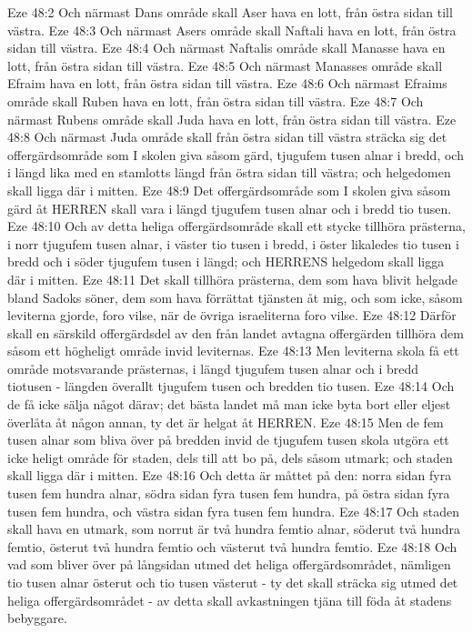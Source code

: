 Eze 48:2  Och närmast Dans område skall Aser hava en lott, från östra sidan till västra.
Eze 48:3  Och närmast Asers område skall Naftali hava en lott, från östra sidan till västra.
Eze 48:4  Och närmast Naftalis område skall Manasse hava en lott, från östra sidan till västra.
Eze 48:5  Och närmast Manasses område skall Efraim hava en lott, från östra sidan till västra.
Eze 48:6  Och närmast Efraims område skall Ruben hava en lott, från östra sidan till västra.
Eze 48:7  Och närmast Rubens område skall Juda hava en lott, från östra sidan till västra.
Eze 48:8  Och närmast Juda område skall från östra sidan till västra sträcka sig det offergärdsområde som I skolen giva såsom gärd, tjugufem tusen alnar i bredd, och i längd lika med en stamlotts längd från östra sidan till västra; och helgedomen skall ligga där i mitten.
Eze 48:9  Det offergärdsområde som I skolen giva såsom gärd åt HERREN skall vara i längd tjugufem tusen alnar och i bredd tio tusen.
Eze 48:10  Och av detta heliga offergärdsområde skall ett stycke tillhöra prästerna, i norr tjugufem tusen alnar, i väster tio tusen i bredd, i öster likaledes tio tusen i bredd och i söder tjugufem tusen i längd; och HERRENS helgedom skall ligga där i mitten.
Eze 48:11  Det skall tillhöra prästerna, dem som hava blivit helgade bland Sadoks söner, dem som hava förrättat tjänsten åt mig, och som icke, såsom leviterna gjorde, foro vilse, när de övriga israeliterna foro vilse.
Eze 48:12  Därför skall en särskild offergärdsdel av den från landet avtagna offergärden tillhöra dem såsom ett högheligt område invid leviternas.
Eze 48:13  Men leviterna skola få ett område motsvarande prästernas, i längd tjugufem tusen alnar och i bredd tiotusen - längden överallt tjugufem tusen och bredden tio tusen.
Eze 48:14  Och de få icke sälja något därav; det bästa landet må man icke byta bort eller eljest överlåta åt någon annan, ty det är helgat åt HERREN.
Eze 48:15  Men de fem tusen alnar som bliva över på bredden invid de tjugufem tusen skola utgöra ett icke heligt område för staden, dels till att bo på, dels såsom utmark; och staden skall ligga där i mitten.
Eze 48:16  Och detta är måttet på den: norra sidan fyra tusen fem hundra alnar, södra sidan fyra tusen fem hundra, på östra sidan fyra tusen fem hundra, och västra sidan fyra tusen fem hundra.
Eze 48:17  Och staden skall hava en utmark, som norrut är två hundra femtio alnar, söderut två hundra femtio, österut två hundra femtio och västerut två hundra femtio.
Eze 48:18  Och vad som bliver över på långsidan utmed det heliga offergärdsområdet, nämligen tio tusen alnar österut och tio tusen västerut - ty det skall sträcka sig utmed det heliga offergärdsområdet - av detta skall avkastningen tjäna till föda åt stadens bebyggare.
